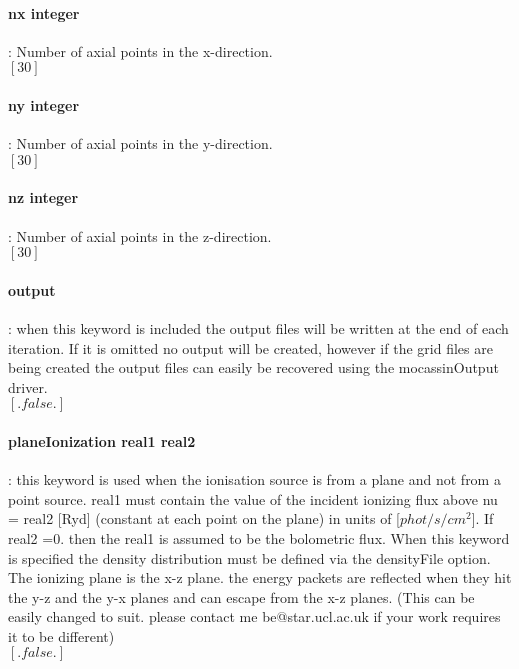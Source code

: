 \documentclass[11pt]{article}
\begin{document}
\paragraph   { nx integer }     : Number of axial points in the x-direction.\\
		     $[30]$\\

\paragraph  {  ny integer}      : Number of axial points in the y-direction.\\
		     $[30]$\\

\paragraph  {  nz integer  }    : Number of axial points in the z-direction.\\
		     $[30]$\\

\paragraph  {  output  }        : when this keyword is included the output files will be written
                    at the end of each iteration. If it is omitted no output will be 
		    created, however if the grid files are being created the output 
                    files can easily be recovered using the mocassinOutput driver. \\
                    $[.false.]$\\
		    
\paragraph  {  planeIonization real1 real2} : this keyword is used when the ionisation source is from a 
                    plane and not from a point source. real1 must contain the value 
		    of the incident ionizing flux above nu = real2 [Ryd] (constant at each point on the plane) in units of 
		    [$phot/s/cm^2$]. If real2 =0. then the real1 is assumed to be the bolometric flux. 
		    When this keyword is specified the density distribution
		    must be defined via the densityFile option. The ionizing plane is the 
		    x-z plane. the energy packets are reflected when they hit the y-z and
		    the y-x planes and can escape from the x-z planes. (This can be easily 
		    changed to suit. please contact me be@star.ucl.ac.uk if your work requires 
		    it to be different)\\
		    $[.false.]$\\
\end{document}
